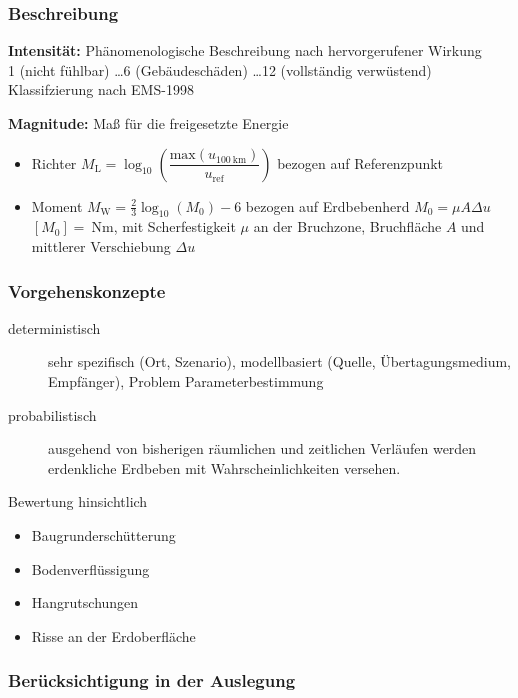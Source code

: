 \begin{frame}
\frametitle{Beschreibung}
\textbf{Intensität:} Phänomenologische Beschreibung nach hervorgerufener Wirkung\\
1 (nicht fühlbar) \dots 6 (Gebäudeschäden) \dots 12 (vollständig verwüstend) Klassifzierung nach EMS-1998

\bigskip

\textbf{Magnitude:} Maß für die freigesetzte Energie
\begin{itemize}
 \item Richter $M_\mathrm{L} = \log_{10}\left(\dfrac{\mathrm{max}(u_{\SI{100}{\kilo\metre}})}{u_\mathrm{ref}} \right)$ bezogen auf Referenzpunkt  %
 \item Moment  $M_\mathrm{W}=\frac{2}{3}\log_{10}(M_0) - 6$  bezogen auf Erdbebenherd $M_0 = \mu A \Delta u$ $[M_0]=\SI{}{\newton\metre}$, mit Scherfestigkeit $\mu$ an der Bruchzone, Bruchfläche $A$ und mittlerer Verschiebung $\Delta u$  %
\end{itemize}
\end{frame}


\begin{frame}
\frametitle{Vorgehenskonzepte}
\begin{description}
 \item[deterministisch] sehr spezifisch (Ort, Szenario), modellbasiert (Quelle, Übertagungsmedium, Empfänger), Problem Parameterbestimmung
 
 \item[probabilistisch] ausgehend von bisherigen räumlichen und zeitlichen Verläufen werden erdenkliche Erdbeben mit Wahrscheinlichkeiten versehen.
\end{description}

\vfill

Bewertung hinsichtlich
\begin{itemize}
 \item Baugrunderschütterung
 \item Bodenverflüssigung
 \item Hangrutschungen
 \item Risse an der Erdoberfläche
\end{itemize}


\end{frame}


\begin{frame}
\frametitle{Berücksichtigung in der Auslegung}


\end{frame}


